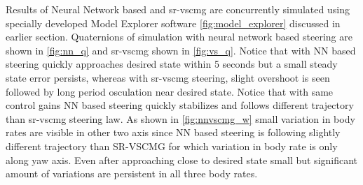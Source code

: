 \noindent Results of Neural Network based and \acrfull{sr-vscmg} are concurrently simulated using specially developed Model Explorer software \autoref{fig:model_explorer} discussed in earlier section. Quaternions of simulation with neural network based steering are shown in \autoref{fig:nn_q} and \acrlong{sr-vscmg} shown in \autoref{fig:vs_q}. Notice that with NN based steering quickly approaches desired state within 5 seconds but a small steady state error persists, whereas with \acrshort{sr-vscmg} steering, slight overshoot is seen followed by long period osculation near desired state. Notice that with same control gains NN based steering quickly stabilizes and follows different trajectory than \acrshort{sr-vscmg} steering law. As shown in \autoref{fig:nnvscmg_w} small variation in body rates are visible in other two axis since NN based steering is following slightly different trajectory than SR-VSCMG for which variation in body rate is only along yaw axis. Even after approaching close to desired state small but significant amount of variations are persistent in all three body rates.
